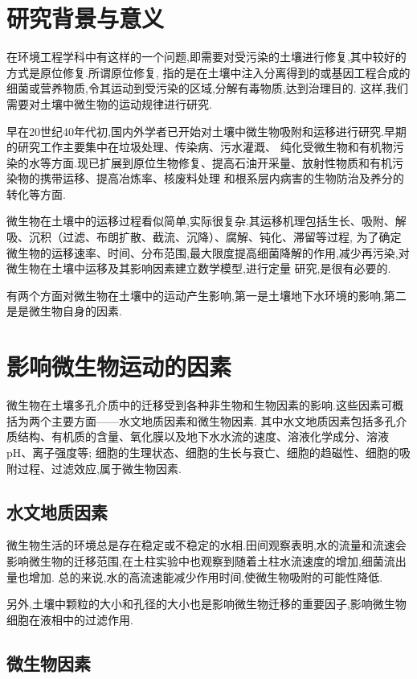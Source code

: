 \documentclass[a4paper,cs4size,adobefonts,fancyhdr]{ctexart}[2005/11/25]
\newcommand{\upcite}[1]{\textsuperscript{\textsuperscript{\cite{#1}}}}
\begin{document}
\setlength{\baselineskip}{22pt}

\section{研究背景与意义}
在环境工程学科中有这样的一个问题,即需要对受污染的土壤进行修复,其中较好的方式是原位修复.所谓原位修复,
指的是在土壤中注入分离得到的或基因工程合成的细菌或营养物质,令其运动到受污染的区域,分解有毒物质,达到治理目的.
这样,我们需要对土壤中微生物的运动规律进行研究.\par
早在20世纪40年代初,国内外学者已开始对土壤中微生物吸附和运移进行研究.早期的研究工作主要集中在垃圾处理、传染病、污水灌溉、
纯化受微生物和有机物污染的水等方面.现已扩展到原位生物修复、提高石油开采量、放射性物质和有机污染物的携带运移、提高冶炼率、核废料处理
和根系层内病害的生物防治及养分的转化等方面.\par
微生物在土壤中的运移过程看似简单,实际很复杂.其运移机理包括生长、吸附、解吸、沉积（过滤、布朗扩散、截流、沉降）、腐解、钝化、滞留等过程,
为了确定微生物的运移速率、时间、分布范围,最大限度提高细菌降解的作用,减少再污染,对微生物在土壤中运移及其影响因素建立数学模型,进行定量
研究,是很有必要的.\par
有两个方面对微生物在土壤中的运动产生影响,第一是土壤地下水环境的影响,第二是是微生物自身的因素\upcite{张瑞玲2007}.
\section{影响微生物运动的因素}
微生物在土壤多孔介质中的迁移受到各种非生物和生物因素的影响.这些因素可概括为两个主要方面——水文地质因素和微生物因素.
其中水文地质因素包括多孔介质结构、有机质的含量、氧化膜以及地下水水流的速度、溶液化学成分、溶液pH、离子强度等;
细胞的生理状态、细胞的生长与衰亡、细胞的趋磁性、细胞的吸附过程、过滤效应,属于微生物因素\upcite{高琼2011}.
\subsection{水文地质因素}
微生物生活的环境总是存在稳定或不稳定的水相.田间观察表明,水的流量和流速会影响微生物的迁移范围,在土柱实验中也观察到随着土柱水流速度的增加,细菌流出量也增加.
总的来说,水的高流速能减少作用时间,使微生物吸附的可能性降低.\par
另外,土壤中颗粒的大小和孔径的大小也是影响微生物迁移的重要因子,影响微生物细胞在液相中的过滤作用.
\subsection{微生物因素}
\end{document}
